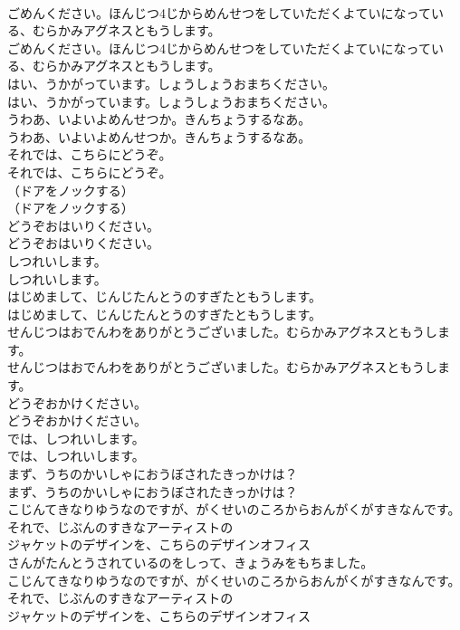 \documentclass[8pt]{extreport}
\begin{document}
\begin{CJK}{UTF8}{min}
\\	ごめんください。ほんじつ4じからめんせつをしていただくよていになっている、むらかみアグネスともうします。	
\\	ごめんください。ほんじつ4じからめんせつをしていただくよていになっている、むらかみアグネスともうします。 
\\	はい、うかがっています。しょうしょうおまちください。	
\\	はい、うかがっています。しょうしょうおまちください。 
\\	うわあ、いよいよめんせつか。きんちょうするなあ。	
\\	うわあ、いよいよめんせつか。きんちょうするなあ。 
\\	それでは、こちらにどうぞ。	
\\	それでは、こちらにどうぞ。 
\\	（ドアをノックする）	
\\	（ドアをノックする） 
\\	どうぞおはいりください。	
\\	どうぞおはいりください。 
\\	しつれいします。	
\\	しつれいします。 
\\	はじめまして、じんじたんとうのすぎたともうします。	
\\	はじめまして、じんじたんとうのすぎたともうします。 
\\	せんじつはおでんわをありがとうございました。むらかみアグネスともうします。	
\\	せんじつはおでんわをありがとうございました。むらかみアグネスともうします。 
\\	どうぞおかけください。	
\\	どうぞおかけください。 
\\	では、しつれいします。	
\\	では、しつれいします。 
\\	まず、うちのかいしゃにおうぼされたきっかけは？	
\\	まず、うちのかいしゃにおうぼされたきっかけは？ 
\\	こじんてきなりゆうなのですが、がくせいのころからおんがくがすきなんです。それで、じぶんのすきなアーティストの
\\	ジャケットのデザインを、こちらのデザインオフィス
\\	さんがたんとうされているのをしって、きょうみをもちました。	
\\	こじんてきなりゆうなのですが、がくせいのころからおんがくがすきなんです。それで、じぶんのすきなアーティストの
\\	ジャケットのデザインを、こちらのデザインオフィス

\end{CJK}
\end{document}
